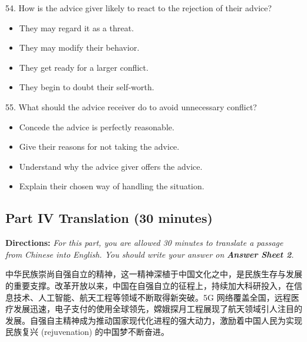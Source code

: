 \documentclass[UTF8,11pt]{ctexart}
\begin{document}
54. How is the advice giver likely to react to the rejection of their advice?


\begin{itemize}[leftmargin=2em,itemsep=.2em,topsep=.4em]\item[A.] They may regard it as a threat.
\item[B.] They may modify their behavior.
\item[C.] They get ready for a larger conflict.
\item[D.] They begin to doubt their self-worth.
\end{itemize}

55. What should the advice receiver do to avoid unnecessary conflict?


\begin{itemize}[leftmargin=2em,itemsep=.2em,topsep=.4em]\item[A.] Concede the advice is perfectly reasonable.
\item[B.] Give their reasons for not taking the advice.
\item[C.] Understand why the advice giver offers the advice.
\item[D.] Explain their chosen way of handling the situation.
\end{itemize}

\subsection*{\textbf{Part IV Translation} \textbf{(30 minutes)}}


\textbf{Directions: }\textit{For this part, you are allowed 30 minutes to translate a passage from Chinese into English. You should} \textit{write your answer on }\textbf{\textit{Answer Sheet 2}}\textit{.}


中华民族崇尚自强自立的精神，这一精神深植于中国文化之中，是民族生存与发展的重要支撑。改革开放以来，中国在自强自立的征程上，持续加大科研投入，在信息技术、人工智能、航天工程等领域不断取得新突破。5G 网络覆盖全国，远程医疗发展迅速，电子支付的使用全球领先，嫦娥探月工程展现了航天领域引人注目的发展。自强自主精神成为推动国家现代化进程的强大动力，激励着中国人民为实现民族复兴 (rejuvenation) 的中国梦不断奋进。
\end{document}
